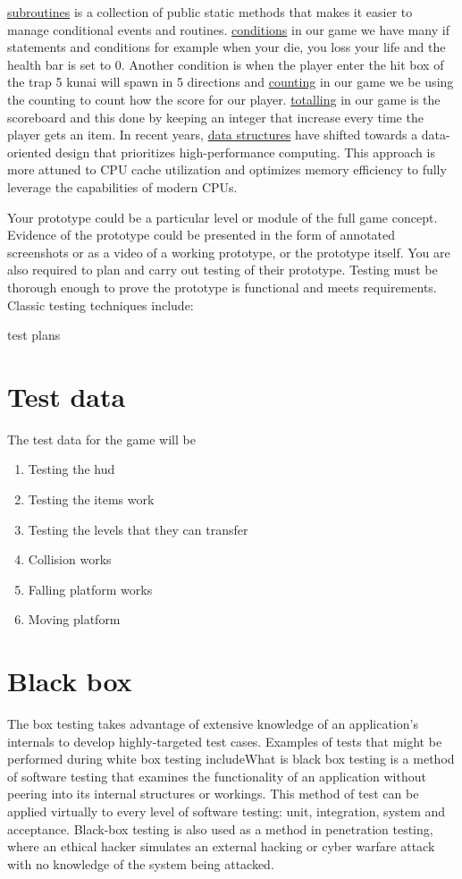 \documentclass{article}
\begin{document}
\underline{subroutines} is a collection of public static methods that makes it easier to manage conditional events and routines. 
\underline{conditions} in our game we have many if statements and conditions for example when your die, you loss your life and the health bar is set to 0. Another condition is when the player enter the hit box of the trap 5 kunai will spawn in 5 directions and 
\underline{counting} in our game we be using the counting to count how the score for our player.
\underline{totalling} in our game is the scoreboard and this done by keeping an integer that increase every time the player gets an item. 
In recent years, \underline{data structures} have shifted towards a data-oriented design that prioritizes high-performance computing. This approach is more attuned to CPU cache utilization and optimizes memory efficiency to fully leverage the capabilities of modern CPUs.







Your prototype could be a particular level or module of the full game concept. Evidence of the
prototype could be presented in the form of annotated screenshots or as a video of a working
prototype, or the prototype itself.
You are also required to plan and carry out testing of their prototype. Testing must be thorough
enough to prove the prototype is functional and meets requirements. Classic testing techniques
include:

test plans
\section{Test data}
The test data for the game will be    
\begin{enumerate}
	\item Testing the hud
	\item Testing the items work
	\item Testing the levels that they can transfer
	\item Collision works
	\item Falling platform works
	\item Moving platform
\end{enumerate}

\section{Black box}
The box testing takes advantage of extensive knowledge of an application’s internals to develop highly-targeted test cases. Examples of tests that might be performed during white box testing includeWhat is black box testing is a method of software testing that examines the functionality of an application without peering into its internal structures or workings. This method of test can be applied virtually to every level of software testing: unit, integration, system and acceptance. Black-box testing is also used as a method in penetration testing, where an ethical hacker simulates an external hacking or cyber warfare attack with no knowledge of the system being attacked. 
\end{document}
